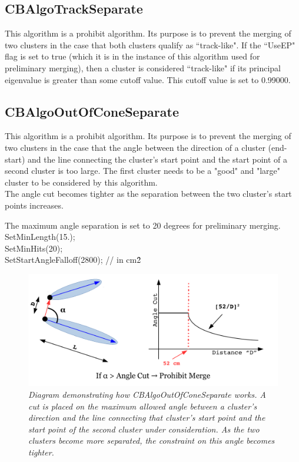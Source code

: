 \documentclass{article}
\begin{document}
\subsection{CBAlgoTrackSeparate}\label{sec:CBAlgoTrackSeparate}
This algorithm is a prohibit algorithm. Its purpose is to prevent the merging of two clusters in the case that both
clusters qualify as ``track-like". If the ``UseEP" flag is set to true (which it is in the instance of this algorithm 
used for preliminary merging), then a cluster is considered ``track-like" if its principal eigenvalue is greater than 
some cutoff value. This cutoff value is set to 0.99000.


\subsection{CBAlgoOutOfConeSeparate}\label{sec:CBAlgoOutOfConeSeparate}
This algorithm is a prohibit algorithm. Its purpose is to prevent the merging of two clusters in the case that the angle
between the direction of a cluster (end-start) and the line connecting the cluster's start point and the start point of 
a second cluster is too large. The first cluster needs to be a "good" and "large" cluster to be considered by this 
algorithm.\\
The angle cut becomes tighter as the separation between the two cluster's start points increases.

The maximum angle separation is set to 20 degrees for preliminary merging.\\
SetMinLength(15.);\\
SetMinHits(20);\\
SetStartAngleFalloff(2800); // in cm\^2 \\
    
\begin{figure}[h!]
\begin{center}
\includegraphics[width=150mm]{Figures/CBAlgoOutOfConeSeparate.pdf}
\end{center}
\caption{\textit{Diagram demonstrating how CBAlgoOutOfConeSeparate works. A cut is placed on the maximum allowed
angle between a cluster's direction and the line connecting that cluster's start point and the start point of
the second cluster under consideration. As the two clusters become more separated, the constraint on this angle
becomes tighter.}}
\label{fig:CBAlgoOutOfConeSeparate}
\end{figure}
    
\end{document}
